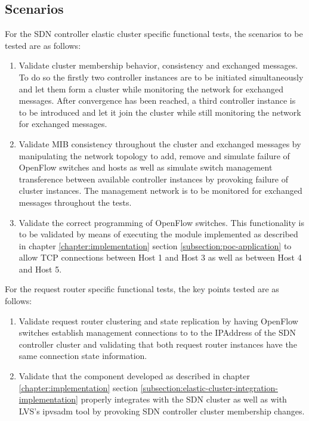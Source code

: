 \subsection{Scenarios}
\label{subsection:functional-tests-scenarios}
For the \gls{SDN} controller elastic cluster specific functional tests, the scenarios to be tested are as follows:
\begin{enumerate}
	\item Validate cluster membership behavior, consistency and exchanged messages. To do so the firstly two controller instances are to be initiated simultaneously and let them form a cluster while monitoring the network for exchanged messages. After convergence has been reached, a third controller instance is to be introduced and let it join the cluster while still monitoring the network for exchanged messages.
	\item Validate \gls{MIB} consistency throughout the cluster and exchanged messages by manipulating the network topology to add, remove and simulate failure of OpenFlow switches and hosts as well as simulate switch management transference between available controller instances by provoking failure of cluster instances. The management network is to be monitored for exchanged messages throughout the tests.
	\item Validate the correct programming of OpenFlow switches. This functionality is to be validated by means of executing the module implemented as described in chapter \ref*{chapter:implementation} section \ref{subsection:poc-application} to allow \gls{TCP} connections between Host 1 and Host 3 as well as between Host 4 and Host 5. 
\end{enumerate}
%
For the request router specific functional tests, the key points tested are as follows:
\begin{enumerate}
	\item Validate request router clustering and state replication by having OpenFlow switches establish management connections to to the \gls{IPAddress} of the \gls{SDN} controller cluster and validating that both request router instances have the same connection state information.
	\item Validate that the component developed as described in chapter \ref*{chapter:implementation} section \ref{subsection:elastic-cluster-integration-implementation} properly integrates with the \gls{SDN} cluster as well as with \gls{LVS}'s ipvsadm tool by provoking \gls{SDN} controller cluster membership changes.
\end{enumerate}
%
